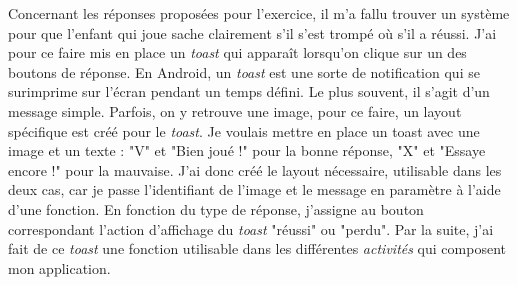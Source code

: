  

Concernant les réponses proposées pour l'exercice, il m'a fallu trouver un système pour que l'enfant qui joue sache clairement s'il s'est trompé où s'il a réussi. J'ai pour ce faire mis en place un \textit{toast} qui apparaît lorsqu'on clique sur un des boutons de réponse. En Android, un \textit{toast} est une sorte de notification qui se surimprime sur l'écran pendant un temps défini. Le plus souvent, il s'agit d'un message simple. Parfois, on y retrouve une image, pour ce faire, un layout spécifique est créé pour le \textit{toast}. Je voulais mettre en place un toast avec une image et un texte : "V" et "Bien joué !" pour la bonne réponse, "X" et "Essaye encore !" pour la mauvaise. J'ai donc créé le layout nécessaire, utilisable dans les deux cas, car je passe l'identifiant de l'image et le message en paramètre à l'aide d'une fonction. En fonction du type de réponse, j'assigne au bouton correspondant l'action d'affichage du \textit{toast} "réussi" ou "perdu". Par la suite, j'ai fait de ce \textit{toast} une fonction utilisable dans les différentes \textit{activités} qui composent mon application.\\

